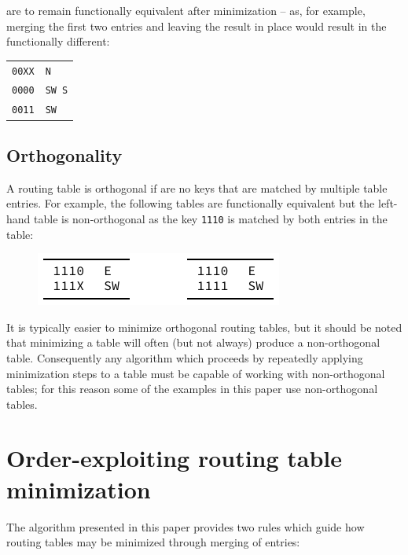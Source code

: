 \documentclass[conference]{IEEEtran}
\newcommand{\mytt}[1]{\texttt{\footnotesize#1}}
\begin{document}
  \noindent are to remain functionally equivalent after minimization -- as, for example, merging the first two entries and leaving the result in place would result in the functionally different:

  \begin{table}[H]
    \centering
    \begin{tabular}{c l}
      \toprule
      \texttt{00XX} & \texttt{N}\\
      \texttt{0000} & \texttt{SW S}\\
      \texttt{0011} & \texttt{SW}\\
      \bottomrule
    \end{tabular}
  \end{table}

  \subsection{Orthogonality}

  A routing table is orthogonal if are no keys that are matched by multiple table entries.
  For example, the following tables are functionally equivalent but the left-hand table is non-orthogonal as the key \mytt{1110} is matched by both entries in the table:

  \begin{figure}[H]
    \centering
    \includegraphics{figures/orthogonality}
  \end{figure}

  It is typically easier to minimize orthogonal routing tables, but it should be noted that minimizing a table will often (but not always) produce a non-orthogonal table.
  Consequently any algorithm which proceeds by repeatedly applying minimization steps to a table must be capable of working with non-orthogonal tables; for this reason some of the examples in this paper use non-orthogonal tables.

  \section{Order-exploiting routing table minimization}

  The algorithm presented in this paper provides two rules which guide how routing tables may be minimized through merging of entries:
\end{document}

